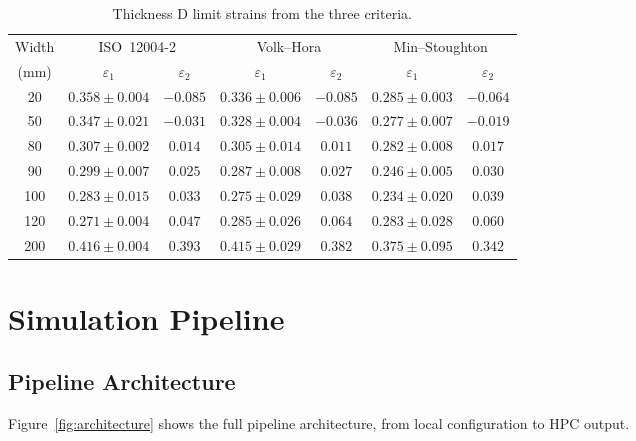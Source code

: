 \begin{table}[H]
    \centering
    \small
    \begin{tabular}{c c c c c c c}
        \toprule
        Width & \multicolumn{2}{c}{ISO~12004-2} & \multicolumn{2}{c}{Volk--Hora} & \multicolumn{2}{c}{Min--Stoughton} \\
        \cmidrule(lr){2-3}\cmidrule(lr){4-5}\cmidrule(lr){6-7}
        (\si{\milli\meter}) & $\varepsilon_1$ & $\varepsilon_2$ & $\varepsilon_1$ & $\varepsilon_2$ & $\varepsilon_1$ & $\varepsilon_2$ \\
        \midrule
        20  & $0.358 \pm 0.004$ & $-0.085$ & $0.336 \pm 0.006$ & $-0.085$ & $0.285 \pm 0.003$ & $-0.064$ \\
        50  & $0.347 \pm 0.021$ & $-0.031$ & $0.328 \pm 0.004$ & $-0.036$ & $0.277 \pm 0.007$ & $-0.019$ \\
        80  & $0.307 \pm 0.002$ & $0.014$  & $0.305 \pm 0.014$ & $0.011$  & $0.282 \pm 0.008$ & $0.017$ \\
        90  & $0.299 \pm 0.007$ & $0.025$  & $0.287 \pm 0.008$ & $0.027$  & $0.246 \pm 0.005$ & $0.030$ \\
        100 & $0.283 \pm 0.015$ & $0.033$  & $0.275 \pm 0.029$ & $0.038$  & $0.234 \pm 0.020$ & $0.039$ \\
        120 & $0.271 \pm 0.004$ & $0.047$  & $0.285 \pm 0.026$ & $0.064$  & $0.283 \pm 0.028$ & $0.060$ \\
        200 & $0.416 \pm 0.004$ & $0.393$  & $0.415 \pm 0.029$ & $0.382$  & $0.375 \pm 0.095$ & $0.342$ \\
        \bottomrule
    \end{tabular}
    \caption[Min--Stoughton campaign comparison, thickness~D]{Thickness D limit strains from the three criteria.}
    \label{tab:ms_campaign_D}
\end{table}

\chapter{Simulation Pipeline}\label{app:pipeline}

\section{Pipeline Architecture}

Figure~\ref{fig:architecture} shows the full pipeline architecture, from local
configuration to HPC output.

